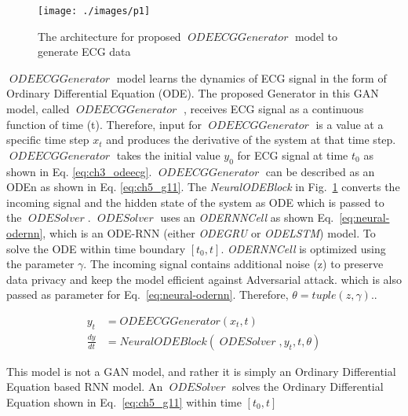 \documentclass{article}
\DeclareMathOperator{\ODESOLVER}{\textit{ODESolver}}
\DeclareMathOperator{\ODEECGGenerator}{\textit{ODEECGGenerator}}
\begin{document}
 \begin{figure}[htb]
 \centering
 	\texttt{[image: ./images/p1]} 
 	\label{fig:odeecgg}
 	\caption{The architecture for proposed $\ODEECGGenerator$  model to generate ECG data} 
 \end{figure}

 $\ODEECGGenerator$  model learns the dynamics of ECG signal in the form of Ordinary Differential Equation (ODE). The proposed Generator in this GAN model, called $\ODEECGGenerator$ , receives ECG signal as a continuous function of time (t). Therefore, input for $\ODEECGGenerator$  is a value at a specific time step $x_{t}$ and produces the derivative of the system at that time step. $\ODEECGGenerator$  takes the initial value $y_0$ for ECG signal at time $t_0$ as shown in Eq. \ref{eq:ch3_odeecg}. $\ODEECGGenerator$  can be described as an ODEn as shown in Eq. \ref{eq:ch5_g11}. The \textit{NeuralODEBlock} in Fig.~\ref{fig:odeecgg} converts the incoming signal and the hidden state of the system as ODE which is passed to the $\ODESOLVER$. $\ODESOLVER$ uses an \textit{ODERNNCell} as shown Eq.~\eqref{eq:neural-odernn}, which is an ODE-RNN  (either \textit{ODEGRU} or \textit{ODELSTM}) model. To solve the ODE within time boundary $[t_{0}, t]$. \textit{ODERNNCell} is optimized using the parameter $\gamma$. The incoming signal contains additional noise (z) to preserve data privacy and keep the model efficient against Adversarial attack. which is also passed as parameter for Eq.~\eqref{eq:neural-odernn}. Therefore,  $\theta = tuple(z, \gamma)$..

\begin{subequations}
\begin{align}
\label{eq:ch3_odeecg}
y_{t}  &= \textit{ODEECGGenerator}(x_t, t)
\\
\label{eq:ch5_g11}
\frac{dy}{dt} &= \textit{NeuralODEBlock}(\ODESOLVER,y_t, t,\theta)
\end{align}
\label{eq:modela}
\end{subequations}

This model is not a GAN model, and rather it is simply an Ordinary Differential Equation based RNN model. An $\ODESOLVER$ solves the Ordinary Differential Equation shown in Eq.~\eqref{eq:ch5_g11} within time $[t_{0}, t]$
\end{document}
